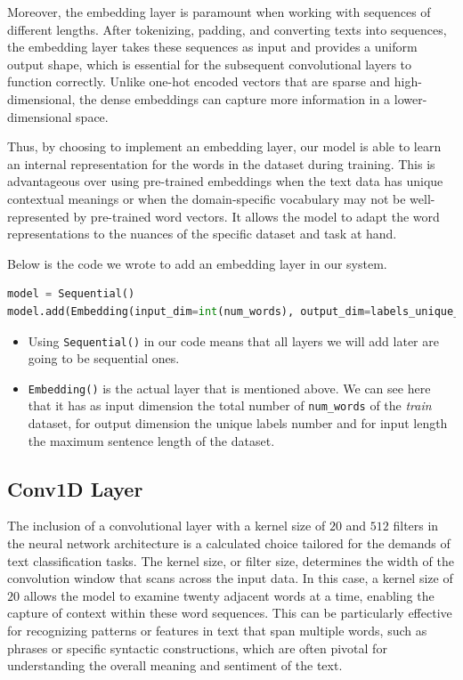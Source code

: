 Moreover, the embedding layer is paramount when working with sequences of different lengths. After tokenizing, padding, and converting texts into sequences, the embedding layer takes these sequences as input and provides a uniform output shape, which is essential for the subsequent convolutional layers to function correctly. Unlike one-hot encoded vectors that are sparse and high-dimensional, the dense embeddings can capture more information in a lower-dimensional space.

Thus, by choosing to implement an embedding layer, our model is able to learn an internal representation for the words in the dataset during training. This is advantageous over using pre-trained embeddings when the text data has unique contextual meanings or when the domain-specific vocabulary may not be well-represented by pre-trained word vectors. It allows the model to adapt the word representations to the nuances of the specific dataset and task at hand.

Below is the code we wrote to add an embedding layer in our system.
\begin{lstlisting}[language=Python]
model = Sequential()
model.add(Embedding(input_dim=int(num_words), output_dim=labels_unique_num, input_length=input_length))
\end{lstlisting}

\begin{itemize}
	\item Using \verb|Sequential()| in our code means that all layers we will add later are going to be sequential ones.
	\item \verb|Embedding()| is the actual layer that is mentioned above. We can see here that it has as input dimension the total number of \verb|num_words| of the \textit{train} dataset, for output dimension the unique labels number and for input length the maximum sentence length of the dataset.
\end{itemize}

\subsection{Conv1D Layer}
The inclusion of a convolutional layer with a kernel size of $20$ and $512$ filters in the neural network architecture is a calculated choice tailored for the demands of text classification tasks. The kernel size, or filter size, determines the width of the convolution window that scans across the input data. In this case, a kernel size of $20$ allows the model to examine twenty adjacent words at a time, enabling the capture of context within these word sequences. This can be particularly effective for recognizing patterns or features in text that span multiple words, such as phrases or specific syntactic constructions, which are often pivotal for understanding the overall meaning and sentiment of the text.

